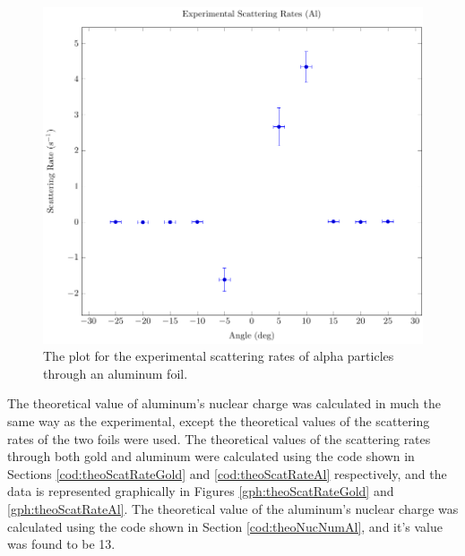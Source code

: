 \documentclass[a4paper]{article}
\begin{document}
\begin{figure}[H]
  \begin{center}
    \includegraphics[scale=0.8]{Plots/ExperimentalScatteringRatesAl/expScatRatesAl.pdf}
  \end{center}
  \caption{The plot for the experimental scattering rates of alpha particles
    through an aluminum foil.}
  \label{gph:expScatRatesAl}
\end{figure}

\qq

\qq The theoretical value of aluminum's nuclear charge was calculated in much
the same way as the experimental, except the theoretical values of the
scattering rates of the two foils were used. The theoretical values of the
scattering rates through both gold and aluminum were calculated using the code
shown in Sections \ref{cod:theoScatRateGold} and \ref{cod:theoScatRateAl}
respectively, and the data is represented graphically in Figures
\ref{gph:theoScatRateGold} and \ref{gph:theoScatRateAl}. The theoretical value
of the aluminum's nuclear charge was calculated using the code shown in Section
\ref{cod:theoNucNumAl}, and it's value was found to be 13.
\end{document}
